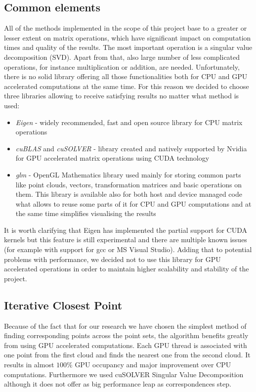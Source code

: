 \documentclass[titlepage]{article}
\begin{document}
\subsection{Common elements}
All of the methods implemented in the scope of this project base to a greater or lesser extent on matrix operations, which have significant impact on computation times and quality of the results. The most important operation is a singular value decomposition (SVD). Apart from that, also large number of less complicated operations, for instance multiplication or addition, are needed. Unfortunately, there is no solid library offering all those functionalities both for CPU and GPU accelerated computations at the same time. For this reason we decided to choose three libraries allowing to receive satisfying results no matter what method is used:
\begin{itemize}
\item \textit{Eigen} - widely recommended, fast and open source library for CPU matrix operations
\item \textit{cuBLAS} and \textit{cuSOLVER} - library created and natively supported by Nvidia for GPU accelerated matrix operations using CUDA technology
\item \textit{glm} - OpenGL Mathematics library used mainly for storing common parts like point clouds, vectors, transformation matrices and basic operations on them. This library is available also for both host and device managed code what allows to reuse some parts of it for CPU and GPU computations and at the same time simplifies visualising the results
\end{itemize}
It is worth clarifying that Eigen has implemented the partial support for CUDA kernels but this feature is still experimental and there are multiple known issues (for example with support for gcc or MS Visual Studio). Adding that to potential problems with performance, we decided not to use this library for GPU accelerated operations in order to maintain higher scalability and stability of the project.

\subsection{Iterative Closest Point}
Because of the fact that for our research we have chosen the simplest method of finding corresponding points across the point sets, the algorithm benefits greatly from using GPU accelerated computations. Each GPU thread is associated with one point from the first cloud and finds the nearest one from the second cloud. It results in almost $100\%$ GPU occupancy and major improvement over CPU computations. Furthermore we used cuSOLVER Singular Value Decomposition although it does not offer as big performance leap as correspondences step.  
\end{document}
